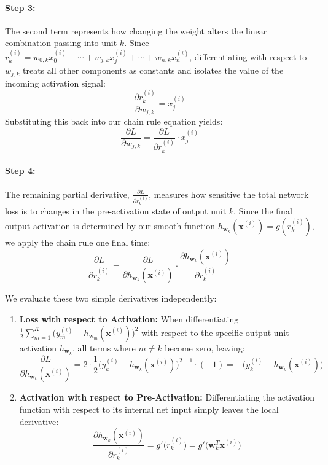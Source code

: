 \paragraph{Step 3:}
The second term represents how changing the weight alters the linear combination passing into unit $k$. Since $r_k^{(i)} = w_{0,k}x_0^{(i)} + \cdots + w_{j,k}x_j^{(i)} + \cdots + w_{n,k}x_n^{(i)}$, differentiating with respect to $w_{j,k}$ treats all other components as constants and isolates the value of the incoming activation signal:
\[
\frac{\partial r_k^{(i)}}{\partial w_{j,k}} = x_j^{(i)}
\]
Substituting this back into our chain rule equation yields:
\[
\frac{\partial L}{\partial w_{j,k}} = \frac{\partial L}{\partial r_k^{(i)}} \cdot x_j^{(i)}
\]

\paragraph{Step 4:}
The remaining partial derivative, $\frac{\partial L}{\partial r_k^{(i)}}$, measures how sensitive the total network loss is to changes in the pre-activation state of output unit $k$. Since the final output activation is determined by our smooth function $h_{\mathbf{w}_k}(\mathbf{x}^{(i)}) = g(r_k^{(i)})$, we apply the chain rule one final time:
\[
\frac{\partial L}{\partial r_k^{(i)}} = \frac{\partial L}{\partial h_{\mathbf{w}_k}(\mathbf{x}^{(i)})} \cdot \frac{\partial h_{\mathbf{w}_k}(\mathbf{x}^{(i)})}{\partial r_k^{(i)}}
\]

We evaluate these two simple derivatives independently:
\begin{enumerate}
    \item \textbf{Loss with respect to Activation:} When differentiating $\frac{1}{2}\sum_{m=1}^K \big(y_m^{(i)} - h_{\mathbf{w}_m}(\mathbf{x}^{(i)})\big)^2$ with respect to the specific output unit activation $h_{\mathbf{w}_k}$, all terms where $m \neq k$ become zero, leaving:
    \[
    \frac{\partial L}{\partial h_{\mathbf{w}_k}(\mathbf{x}^{(i)})} = 2 \cdot \frac{1}{2} \big(y_k^{(i)} - h_{\mathbf{w}_k}(\mathbf{x}^{(i)})\big)^{2-1} \cdot (-1) = -\big(y_k^{(i)} - h_{\mathbf{w}_k}(\mathbf{x}^{(i)})\big)
    \]
    \item \textbf{Activation with respect to Pre-Activation:} Differentiating the activation function with respect to its internal net input simply leaves the local derivative:
    \[
    \frac{\partial h_{\mathbf{w}_k}(\mathbf{x}^{(i)})}{\partial r_k^{(i)}} = g'\big(r_k^{(i)}\big) = g'\big(\mathbf{w}_k^T\mathbf{x}^{(i)}\big)
    \]
\end{enumerate}

